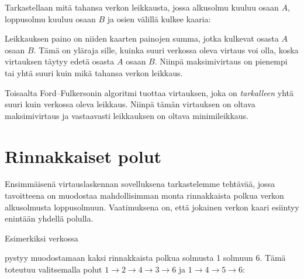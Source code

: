 Tarkastellaan mitä tahansa verkon leikkausta,
jossa alkusolmu kuuluu osaan $A$,
loppusolmu kuuluu osaan $B$ ja osien välillä kulkee kaaria:

\begin{center}
\end{center}

Leikkauksen paino on niiden kaarten painojen summa,
jotka kulkevat osasta $A$ osaan $B$.
Tämä on yläraja sille, kuinka suuri verkossa oleva virtaus voi olla,
koska virtauksen täytyy edetä osasta $A$ osaan $B$.
Niinpä maksimivirtaus on pienempi tai yhtä suuri kuin
mikä tahansa verkon leikkaus.

Toisaalta Ford–Fulkersonin algoritmi tuottaa virtauksen,
joka on \emph{tarkalleen} yhtä suuri kuin verkossa oleva leikkaus.
Niinpä tämän virtauksen on oltava maksimivirtaus ja
vastaavasti leikkauksen on oltava minimileikkaus.

\section{Rinnakkaiset polut}

Ensimmäisenä virtauslaskennan sovelluksena tarkastelemme
tehtävää, jossa tavoitteena on muodostaa mahdollisimman
monta rinnakkaista polkua verkon alkusolmusta loppusolmuun.
Vaatimuksena on, että jokainen verkon kaari esiintyy
enintään yhdellä polulla.

Esimerkiksi verkossa
\begin{center}
\end{center}
pystyy muodostamaan kaksi rinnakkaista polkua solmusta 1 solmuun 6.
Tämä toteutuu valitsemalla polut
$1 \rightarrow 2 \rightarrow 4 \rightarrow 3 \rightarrow 6$
ja $1 \rightarrow 4 \rightarrow 5 \rightarrow 6$:

